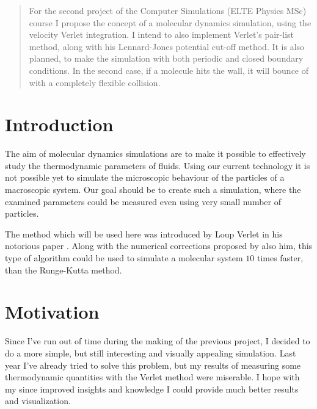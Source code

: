 \begin{abstract}
    \noindent For the second project of the Computer Simulations (ELTE Physics MSc) course I propose the concept of a molecular dynamics simulation, using the velocity Verlet integration. I intend to also implement Verlet's pair-list method, along with his Lennard-Jones potential cut-off method. It is also planned, to make the simulation with both periodic and closed boundary conditions. In the second case, if a molecule hits the wall, it will bounce of with a completely flexible collision.
\end{abstract}

\begin{multicols}{2}
\section{Introduction}
The aim of molecular dynamics simulations are to make it possible to effectively study the thermodynamic parameters of fluids. Using our current technology it is not possible yet to simulate the microscopic behaviour of the particles of a macroscopic system. Our goal should be to create such a simulation, where the examined parameters could be measured even using very small number of particles. \par
The method which will be used here was introduced by Loup Verlet in his notorious paper \citep{verlet1967computer}. Along with the numerical corrections proposed by also him, this type of algorithm could be used to simulate a molecular system $10$ times faster, than the Runge-Kutta method.

\section{Motivation}
Since I've run out of time during the making of the previous project, I decided to do a more simple, but still interesting and visually appealing simulation. Last year I've already tried  to solve this problem, but my results of measuring some thermodynamic quantities with the Verlet method were miserable. I hope with my since improved insights and knowledge I could provide much better results and visualization.


\end{multicols}

